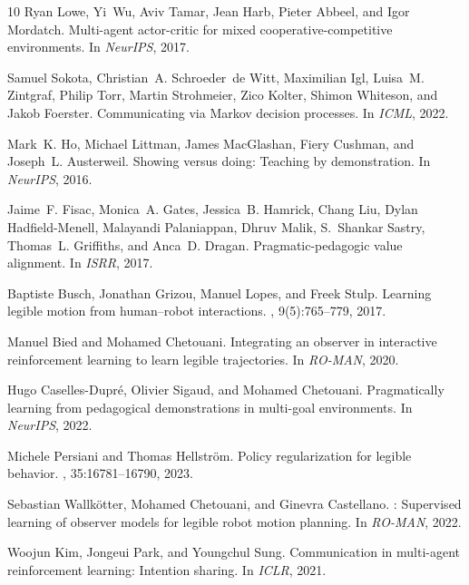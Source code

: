 \documentclass[sigconf,review,anonymous]{acmart}
\begin{document}
\begin{thebibliography}{10}
Ryan Lowe, Yi~Wu, Aviv Tamar, Jean Harb, Pieter Abbeel, and Igor Mordatch.
\newblock Multi-agent actor-critic for mixed cooperative-competitive environments.
\newblock In {\em NeurIPS}, 2017.

Samuel Sokota, Christian~A. Schroeder~de Witt, Maximilian Igl, Luisa~M. Zintgraf, Philip Torr, Martin Strohmeier, Zico Kolter, Shimon Whiteson, and Jakob Foerster.
\newblock Communicating via Markov decision processes.
\newblock In {\em ICML}, 2022.

Mark~K. Ho, Michael Littman, James MacGlashan, Fiery Cushman, and Joseph~L. Austerweil.
\newblock Showing versus doing: Teaching by demonstration.
\newblock In {\em NeurIPS}, 2016.

Jaime~F. Fisac, Monica~A. Gates, Jessica~B. Hamrick, Chang Liu, Dylan Hadfield-Menell, Malayandi Palaniappan, Dhruv Malik, S.~Shankar Sastry, Thomas~L. Griffiths, and Anca~D. Dragan.
\newblock Pragmatic-pedagogic value alignment.
\newblock In {\em ISRR}, 2017.

Baptiste Busch, Jonathan Grizou, Manuel Lopes, and Freek Stulp.
\newblock Learning legible motion from human--robot interactions.
, 9(5):765--779, 2017.

Manuel Bied and Mohamed Chetouani.
\newblock Integrating an observer in interactive reinforcement learning to learn legible trajectories.
\newblock In {\em RO-MAN}, 2020.

Hugo Caselles-Dupr{\'e}, Olivier Sigaud, and Mohamed Chetouani.
\newblock Pragmatically learning from pedagogical demonstrations in multi-goal environments.
\newblock In {\em NeurIPS}, 2022.

Michele Persiani and Thomas Hellström.
\newblock Policy regularization for legible behavior.
, 35:16781--16790, 2023.

Sebastian Wallk{\"o}tter, Mohamed Chetouani, and Ginevra Castellano.
: Supervised learning of observer models for legible robot motion planning.
\newblock In {\em RO-MAN}, 2022.

Woojun Kim, Jongeui Park, and Youngchul Sung.
\newblock Communication in multi-agent reinforcement learning: Intention sharing.
\newblock In {\em ICLR}, 2021.


\end{thebibliography}
\end{document}
